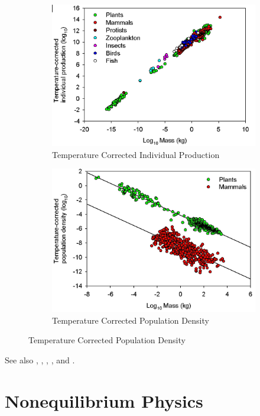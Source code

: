 \documentclass[]{article}
\begin{document}
\begin{figure}[H]
	\caption{And Ecology}\label{eq:AndEcology}
	\begin{subfigure}[b]{0.5\textwidth}
		\caption{Temperature Corrected Individual Production}
		\includegraphics[width=\textwidth]{AndEcology1}
	\end{subfigure}
	\begin{subfigure}[b]{0.5\textwidth}
		\caption{Temperature Corrected Population Density}
		\includegraphics[width=\textwidth]{AndEcology2}
	\end{subfigure}
\end{figure}
See also \cite{odum1976energy}, \cite{odum1983systems}, \cite{schmidt1997animal}, \cite{brown2004toward}, and \cite{kempes2017thermodynamic}.

\section{Nonequilibrium Physics}
\end{document}
